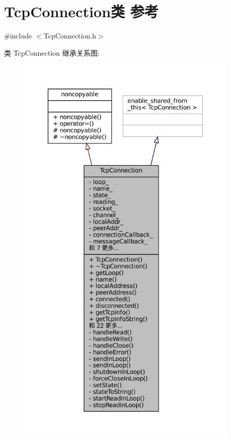 \hypertarget{classmuduo_1_1net_1_1TcpConnection}{}\section{Tcp\+Connection类 参考}
\label{classmuduo_1_1net_1_1TcpConnection}


{\ttfamily \#include $<$Tcp\+Connection.\+h$>$}



类 Tcp\+Connection 继承关系图\+:
\nopagebreak
\begin{figure}[H]
\begin{center}
\leavevmode
\includegraphics[height=550pt]{classmuduo_1_1net_1_1TcpConnection__inherit__graph}
\end{center}
\end{figure}


